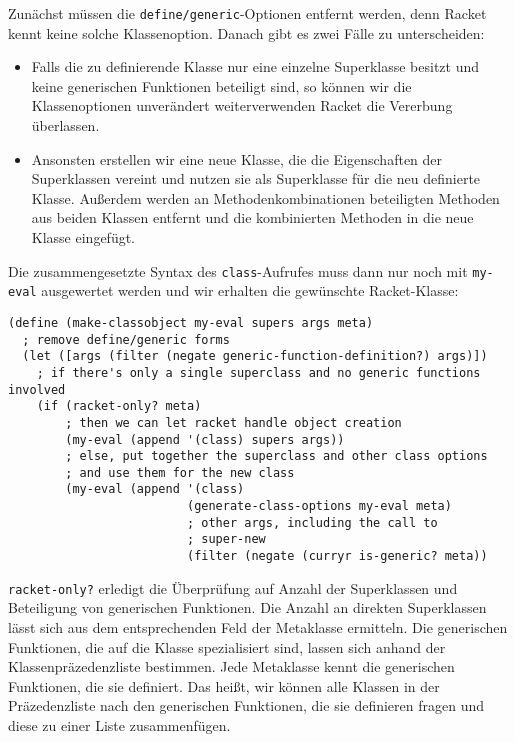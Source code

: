 Zunächst müssen die \texttt{define/generic}-Optionen entfernt werden, denn Racket kennt keine solche Klassenoption. Danach gibt es zwei Fälle zu unterscheiden:
\begin{itemize}
 \item Falls die zu definierende Klasse nur eine einzelne Superklasse besitzt und keine generischen Funktionen beteiligt sind, so können wir die Klassenoptionen unverändert weiterverwenden Racket die Vererbung überlassen.
 \item Ansonsten erstellen wir eine neue Klasse, die die Eigenschaften der Superklassen vereint und nutzen sie als Superklasse für die neu definierte Klasse. Außerdem werden an  Methodenkombinationen beteiligten Methoden aus beiden Klassen entfernt und die kombinierten Methoden in die neue Klasse eingefügt.
\end{itemize}

Die zusammengesetzte Syntax des \texttt{class}-Aufrufes muss dann nur noch mit \texttt{my-eval} ausgewertet werden und wir erhalten die gewünschte Racket-Klasse:

\begin{lstlisting}
(define (make-classobject my-eval supers args meta)
  ; remove define/generic forms
  (let ([args (filter (negate generic-function-definition?) args)])
    ; if there's only a single superclass and no generic functions involved
    (if (racket-only? meta)
        ; then we can let racket handle object creation
        (my-eval (append '(class) supers args))
        ; else, put together the superclass and other class options
        ; and use them for the new class
        (my-eval (append '(class)
                         (generate-class-options my-eval meta)
                         ; other args, including the call to
                         ; super-new
                         (filter (negate (curryr is-generic? meta)) 
\end{lstlisting}

\texttt{racket-only?} erledigt die Überprüfung auf Anzahl der Superklassen und Beteiligung von generischen Funktionen. Die Anzahl an direkten Superklassen lässt sich aus dem entsprechenden Feld der Metaklasse ermitteln. Die generischen Funktionen, die auf die Klasse spezialisiert sind, lassen sich anhand der Klassenpräzedenzliste bestimmen. Jede Metaklasse kennt die generischen Funktionen, die sie definiert. Das heißt, wir können alle Klassen in der Präzedenzliste nach den generischen Funktionen, die sie definieren fragen und diese zu einer Liste zusammenfügen. 

